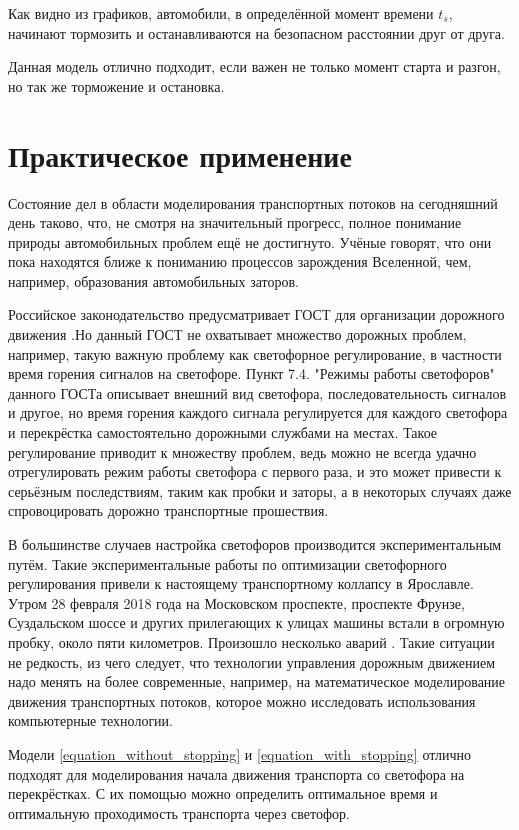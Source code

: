 \documentclass[12pt, a4paper]{extarticle}
\numberwithin{equation}{section}
\begin{document}
Как видно из графиков, автомобили, в определённой момент времени $t_s$, начинают тормозить и останавливаются на безопасном расстоянии друг от друга. 

Данная модель отлично подходит, если важен не только момент старта и разгон, но так же торможение и остановка.
 

\section{Практическое применение} 

Состояние дел в области моделирования транспортных потоков на сегодняшний день таково, что, не смотря на значительный прогресс, полное понимание природы автомобильных проблем ещё не достигнуто. Учёные
говорят, что они пока находятся ближе к пониманию процессов зарождения Вселенной, чем, например, образования автомобильных заторов. 

Российское законодательство предусматривает ГОСТ для организации дорожного движения \cite{Gost}.Но данный ГОСТ не охватывает множество дорожных проблем, например, такую важную проблему как светофорное регулирование, в частности время горения сигналов на светофоре. Пункт 7.4. "Режимы работы светофоров"  данного ГОСТа описывает внешний вид светофора, последовательность сигналов и другое, но время горения каждого сигнала регулируется для каждого светофора и перекрёстка самостоятельно дорожными службами на местах. Такое регулирование приводит к множеству проблем, ведь можно не всегда удачно отрегулировать режим работы светофора с первого раза, и это может привести к серьёзным последствиям, таким как пробки и заторы, а в некоторых случаях даже спровоцировать дорожно транспортные прошествия.

В большинстве случаев настройка светофоров производится экспериментальным путём. Такие экспериментальные 
работы по оптимизации светофорного регулирования привели к настоящему транспортному коллапсу в Ярославле.
Утром 28 февраля 2018 года на Московском проспекте, проспекте Фрунзе, Суздальском шоссе и других прилегающих к улицах машины встали в огромную пробку, около пяти километров. Произошло несколько аварий \cite{News}. Такие ситуации не редкость, из чего следует, что технологии управления дорожным движением надо менять на более современные, например, на математическое моделирование движения транспортных потоков, которое можно исследовать использования компьютерные технологии. 

Модели \eqref{equation_without_stopping} и \eqref{equation_with_stopping} отлично подходят для моделирования начала движения транспорта со светофора на перекрёстках. С их помощью можно определить оптимальное время и оптимальную проходимость транспорта через светофор. 
\end{document}

